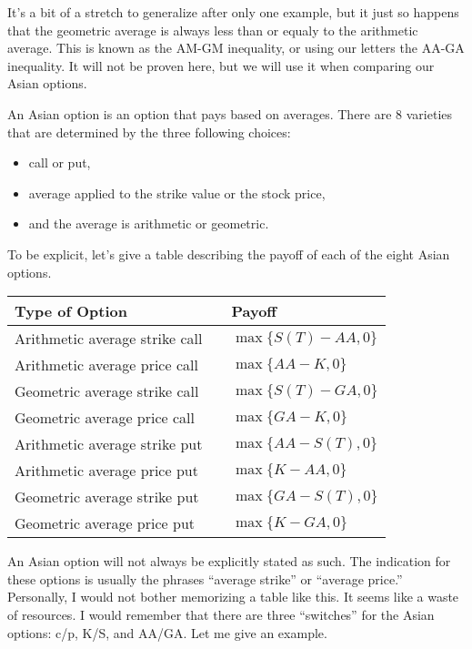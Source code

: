 \documentclass{ximera}
\begin{document}
It's a bit of a stretch to generalize after only one example, but it just so happens that the geometric average is always less than or equaly to the arithmetic average. This is known as the AM-GM inequality, or using our letters the AA-GA inequality. It will not be proven here, but we will use it when comparing our Asian options.

\begin{definition}
An Asian option is an option that pays based on averages. There are 8 varieties that are determined by the three following choices:
	\begin{itemize}
	\item call or put,
	\item average applied to the strike value or the stock price,
	\item and the average is arithmetic or geometric.
	\end{itemize}
\end{definition}

To be explicit, let's give a table describing the payoff of each of the eight Asian options.

\begin{center}
\begin{tabular}{lll}
Type of Option			&	&	Payoff\\
\hline
Arithmetic average strike call	&	&	$\max\{S(T)-AA, 0\}$\\
Arithmetic average price call	&	&	$\max\{AA-K,0\}$\\
Geometric average strike call	&	&	$\max\{S(T)-GA,0\}$\\
Geometric average price call	&	&	$\max\{GA-K,0\}$\\
Arithmetic average strike put	&	&	$\max\{AA-S(T), 0\}$\\
Arithmetic average price put	&	&	$\max\{K-AA,0\}$\\
Geometric average strike put	&	&	$\max\{GA-S(T),0\}$\\
Geometric average price put	&	&	$\max\{K-GA,0\}$\\
\hline
\end{tabular}
\end{center}

An Asian option will not always be explicitly stated as such. The indication for these options is usually the phrases ``average strike'' or ``average price.'' Personally, I would not bother memorizing a table like this. It seems like a waste of resources. I would remember that there are three ``switches'' for the Asian options: c/p, K/S, and AA/GA. Let me give an example.
\end{document}
